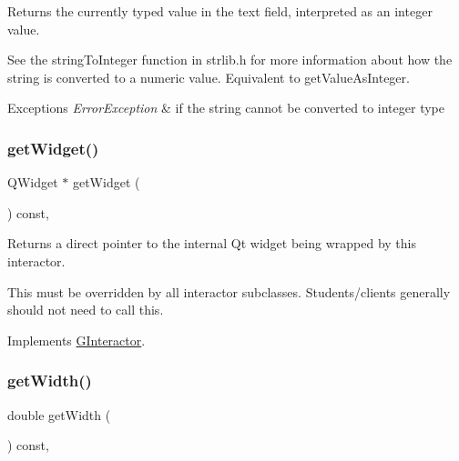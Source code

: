 Returns the currently typed value in the text field, interpreted as an integer value. 

See the string\+To\+Integer function in strlib.\+h for more information about how the string is converted to a numeric value. Equivalent to get\+Value\+As\+Integer. 
\begin{DoxyExceptions}{Exceptions}
{\em Error\+Exception} & if the string cannot be converted to integer type \\
\hline
\end{DoxyExceptions}
\mbox{\label{classsgl_1_1GTextField_a3b33a602b31a6b809d020535a59db3b4}} 
\subsubsection{\texorpdfstring{get\+Widget()}{getWidget()}}
{\footnotesize\ttfamily Q\+Widget $\ast$ get\+Widget (\begin{DoxyParamCaption}{ }\end{DoxyParamCaption}) const\hspace{0.3cm}{\ttfamily [override]}, {\ttfamily [virtual]}}



Returns a direct pointer to the internal Qt widget being wrapped by this interactor. 

This must be overridden by all interactor subclasses. Students/clients generally should not need to call this. 

Implements \mbox{\hyperlink{classsgl_1_1GInteractor}{G\+Interactor}}.

\mbox{\label{classsgl_1_1GInteractor_a0ed2965abd4f5701d2cadf71239faf19}} 
\subsubsection{\texorpdfstring{get\+Width()}{getWidth()}}
{\footnotesize\ttfamily double get\+Width (\begin{DoxyParamCaption}{ }\end{DoxyParamCaption}) const\hspace{0.3cm}{\ttfamily [virtual]}, {\ttfamily [inherited]}}



